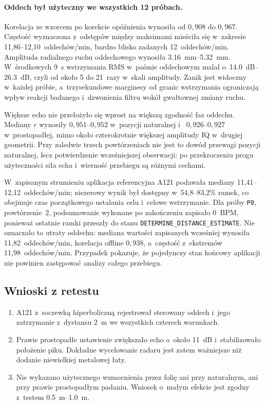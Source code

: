 \documentclass[12pt,a4paper,oneside]{report}
\begin{document}
\paragraph{Oddech był użyteczny we wszystkich 12 próbach.} Korelacja ze
wzorcem po korekcie opóźnienia wynosiła od $0{,}908$ do $0{,}967$. Częstość
wyznaczona z~odstępów między maksimami mieściła się w~zakresie
11,86--12,10~oddechów/min, bardzo blisko zadanych 12~oddechów/min. Amplituda
radialnego ruchu oddechowego wynosiła
\SIrange{3.16}{5.32}{mm}. W~środkowych \SI{9}{s} wstrzymania RMS w~paśmie
oddechowym malał o~\SIrange{14.0}{26.3}{dB}, czyli od około 5 do 21~razy
w~skali amplitudy. Zanik jest widoczny w~każdej próbie, a~trzysekundowe
marginesy od granic wstrzymania ograniczają wpływ reakcji badanego i~dzwonienia
filtru wokół gwałtownej zmiany ruchu.

Większe echo nie przełożyło się wprost na większą zgodność faz oddechu.
Mediany $r$ wynosiły $0{,}951$--$0{,}952$ w~pozycji naturalnej i~
$0{,}926$--$0{,}927$ w~prostopadłej, mimo około czterokrotnie większej
amplitudy IQ w~drugiej geometrii. Przy zaledwie trzech powtórzeniach nie jest
to dowód przewagi pozycji naturalnej, lecz potwierdzenie wcześniejszej
obserwacji: po przekroczeniu progu użyteczności siła echa i~wierność przebiegu
są różnymi cechami.

W~zapisanym strumieniu aplikacja referencyjna A121 podawała mediany
11,41--12,12~oddechów/min; niezerowy wynik był dostępny
w~54,8--83,2\% ramek, co obejmuje czas początkowego ustalania celu i~celowe
wstrzymanie. Dla próby \texttt{P0}, powtórzenie~2, podsumowanie wykonane po
zakończeniu zapisało 0~BPM, ponieważ ostatnie ramki przeszły do stanu
\texttt{DETERMINE\_DISTANCE\_ESTIMATE}. Nie oznaczało to utraty oddechu:
mediana wartości zapisanych wcześniej wynosiła 11,82~oddechów/min,
korelacja offline $0{,}938$, a~częstość z~ekstremów 11,98~oddechów/min.
Przypadek pokazuje, że pojedynczy stan
końcowy aplikacji nie powinien zastępować analizy całego przebiegu.

\subsection{Wnioski z retestu}

\begin{enumerate}
  \item A121 z~soczewką hiperboliczną rejestrował sterowany oddech i~jego
  zatrzymanie z~dystansu \SI{2}{m} we wszystkich czterech warunkach.
  \item Prawie prostopadłe ustawienie zwiększało echo o~około \SI{11}{dB}
  i~stabilizowało położenie piku. Dokładne wycelowanie radaru jest zatem
  ważniejsze niż dodanie niewielkiej metalowej łaty.
  \item Nie wykazano użytecznego wzmocnienia przez folię ani przy naturalnym,
  ani przy prawie prostopadłym padaniu. Wniosek o~małym efekcie jest zgodny
  z~testem \SIrange{0.5}{1.0}{m}.
\end{enumerate}
\end{document}
